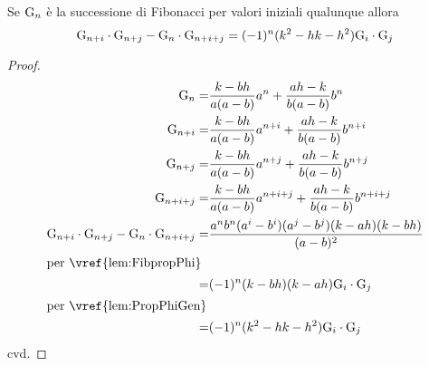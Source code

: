 \begin{thm}\label{thm:fibVajdaGen}
	Se $\mathrm{G}_{n}$ è la successione di Fibonacci per valori iniziali qualunque 
	allora 
	\begin{equation}
		\mathrm{G}_{n+i}\cdot\mathrm{G}_{n+j}-\mathrm{G}_{n}\cdot\mathrm{G}_{n+i+j}=(-1)^{n}(k^2-hk-h^2)\mathrm{G}_{i}\cdot\mathrm{G}_{j}
	\end{equation}\label{eqn:fibVajdaGen}
\end{thm}
\begin{proof}
	\begin{align*}
		\Gib{n}=&{}\dfrac{k-bh}{a(a-b)}a^n+\dfrac{ah-k}{b(a-b)}b^n\\
		\Gib{n+i}=&{}\dfrac{k-bh}{a(a-b)}a^{n+i}+\dfrac{ah-k}{b(a-b)}b^{n+i}\\
		\Gib{n+j}=&{}\dfrac{k-bh}{a(a-b)}a^{n+j}+\dfrac{ah-k}{b(a-b)}b^{n+j}\\
		\Gib{n+i+j}=&{}\dfrac{k-bh}{a(a-b)}a^{n+i+j}+\dfrac{ah-k}{b(a-b)}b^{n+i+j}\\
		\Gib{n+i}\cdot\Gib{n+j}-\Gib{n}\cdot\Gib{n+i+j}=&\dfrac{a^nb^n(a^i-b^i)(a^j-b^j)(k-ah)(k-bh)}{(a-b)^2}\\
		\intertext{per~\vref{lem:FibpropPhi}}
		=&(-1)^{n}(k-bh)(k-ah)\Gib{i}\cdot\Gib{j}\\
		\intertext{per~\vref{lem:PropPhiGen}}
		=&(-1)^{n}(k^2-hk-h^2)\Gib{i}\cdot\Gib{j}\\
	\end{align*}
	cvd.
\end{proof}
